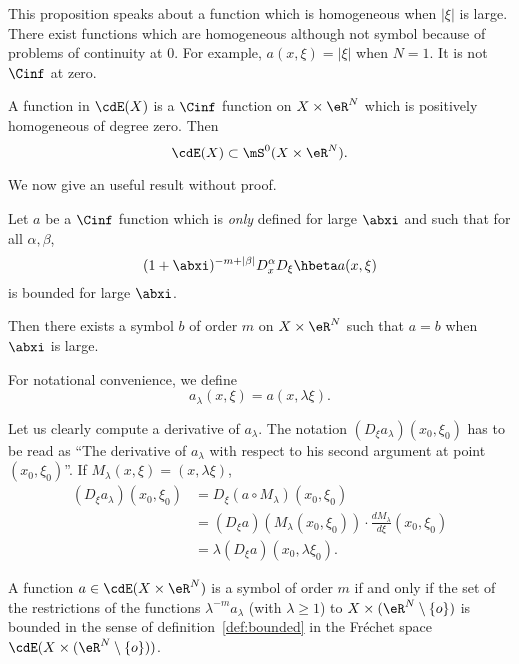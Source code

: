 This proposition speaks about a function which is homogeneous when $|\xi|$ is large. There exist functions which are homogeneous although not symbol because of problems of continuity at $0$. For example, $a(x,\xi)=|\xi|$ when $N=1$. It is not $\Cinf$ at zero.
\begin{remark}
	A function in $\cdE(X)$ is a $\Cinf$ function on $X\times\eR^N$ which is positively homogeneous of degree zero. Then
	\[
		\cdE(X)\subset\mS^0(X\times\eR^N).
	\]
\end{remark}

We now give an useful result without proof.
\begin{proposition}
	Let $a$ be a $\Cinf$ function which is \emph{only} defined for large $\abxi$ and such that for all $\alpha,\beta$,
	\[
		(1+\abxi)^{-m+|\beta|}D_x^{\alpha} D_{\xi}\hbeta a(x,\xi)
	\]
	is bounded for large $\abxi$.

	Then there exists a symbol $b$ of order $m$ on $X\times \eR^N$ such that $a=b$ when $\abxi$ is large.
\end{proposition}

For notational convenience, we define
\begin{equation} \label{eq:def_ablambda}
	a_{\lambda}(x,\xi)=a(x,\lambda\xi).
\end{equation}

Let us clearly compute a derivative of $a_{\lambda}$. The notation $(D_{\xi}a_{\lambda})(x_0,\xi_0)$ has to be read as ``The derivative of $a_{\lambda}$ with respect to his second argument at point $(x_0,\xi_0)$''.  If $M_{\lambda}(x,\xi)=(x,\lambda\xi)$,
\begin{equation}
	\begin{split}
		(D_{\xi}a_{\lambda})(x_0,\xi_0)&=D_{\xi}(a\circ M_{\lambda})(x_0,\xi_0)\\
		&=(D_{\xi}a)(M_{\lambda}(x_0,\xi_0))\cdot \frac{dM_{\lambda}}{d\xi}(x_0,\xi_0)\\
		&=\lambda(D_{\xi}a)(x_0,\lambda\xi_0).
	\end{split}
\end{equation}

\begin{theorem}\label{tho:dieu23.16.6}
	A function $a\in\cdE(X\times\eR^N)$ is a symbol of order $m$ if and only if the set of the restrictions of the functions $\lambda^{-m}a_{\lambda}$ (with $\lambda\geq 1$) to $X\times(\eR^N\setminus\{o\})$ is bounded in the sense of definition~\ref{def:bounded}   in the Fréchet space $\cdE(X\times(\eR^N\setminus\{o\}))$.
\end{theorem}

